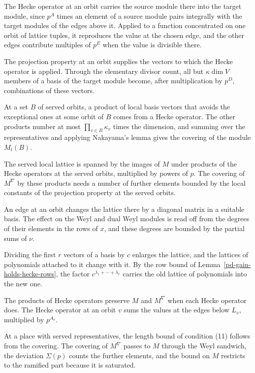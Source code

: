 The Hecke operator at an orbit carries the source module there into the target module, since $p^A$
times an element of a source module pairs integrally with the target modules of the edges above it.
Applied to a function concentrated on one orbit of lattice tuples, it reproduces the value at the
chosen edge, and the other edges contribute multiples of $p^E$ when the value is divisible there.

The projection property at an orbit supplies the vectors to which the Hecke operator is applied.
Through the elementary divisor count, all but $\kappa\dim V$ members of a basis of the target module
become, after multiplication by $p^D$, combinations of these vectors.

At a set $B$ of served orbits, a product of local basis vectors that avoids the exceptional ones at
some orbit of $B$ comes from a Hecke operator. The other products number at most
$\prod_{v\in B}\kappa_v$ times the dimension, and summing over the representatives and applying
Nakayama's lemma gives the covering of the module $M_t(B)$.

The served local lattice is spanned by the images of $M$ under products of the Hecke operators at the
served orbits, multiplied by powers of $p$. The covering of $M^\nabla$ by these products needs a
number of further elements bounded by the local constants of the projection property at the served
orbits.

An edge at an orbit changes the lattice there by a diagonal matrix in a suitable basis. The effect on
the Weyl and dual Weyl modules is read off from the degrees of their elements in the rows of $x$, and
these degrees are bounded by the partial sums of $\nu$.

Dividing the first $r$ vectors of a basis by $c$ enlarges the lattice, and the lattices of polynomials
attached to it change with it. By the row bound of Lemma~\ref{pd-gain-holds-hecke-rows}, the factor
$c^{\lambda_1+\cdots+\lambda_r}$ carries the old lattice of polynomials into the new one.

The products of Hecke operators preserve $M$ and $M^\nabla$ when each Hecke operator does. The Hecke
operator at an orbit $v$ sums the values at the edges below $L_v$, multiplied by $p^{A_v}$.

At a place with served representatives, the length bound of condition (11) follows from the covering.
The covering of $M^\nabla$ passes to $M$ through the Weyl sandwich, the deviation $\Sigma(p)$ counts
the further elements, and the bound on $M$ restricts to the ramified part because it is saturated.

